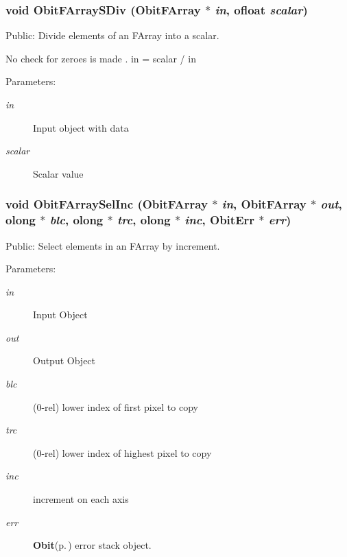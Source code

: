 \subsubsection{\setlength{\rightskip}{0pt plus 5cm}void Obit\-FArray\-SDiv ({\bf Obit\-FArray} $\ast$ {\em in}, {\bf ofloat} {\em scalar})}\label{ObitFArray_8h_a85}


Public: Divide elements of an FArray into a scalar. 

No check for zeroes is made . in = scalar / in \begin{Desc}
\item[Parameters:]
\begin{description}
\item[{\em in}]Input object with data \item[{\em scalar}]Scalar value \end{description}
\end{Desc}
\subsubsection{\setlength{\rightskip}{0pt plus 5cm}void Obit\-FArray\-Sel\-Inc ({\bf Obit\-FArray} $\ast$ {\em in}, {\bf Obit\-FArray} $\ast$ {\em out}, {\bf olong} $\ast$ {\em blc}, {\bf olong} $\ast$ {\em trc}, {\bf olong} $\ast$ {\em inc}, {\bf Obit\-Err} $\ast$ {\em err})}\label{ObitFArray_8h_a108}


Public: Select elements in an FArray by increment. 

\begin{Desc}
\item[Parameters:]
\begin{description}
\item[{\em in}]Input Object \item[{\em out}]Output Object \item[{\em blc}](0-rel) lower index of first pixel to copy \item[{\em trc}](0-rel) lower index of highest pixel to copy \item[{\em inc}]increment on each axis \item[{\em err}]{\bf Obit}{\rm (p.\,\pageref{structObit})} error stack object. \end{description}
\end{Desc}
